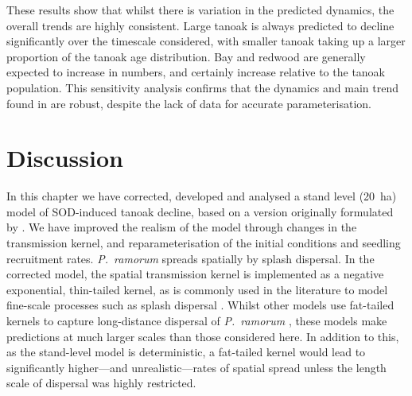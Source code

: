 These results show that whilst there is variation in the predicted dynamics, the overall trends are highly consistent. Large tanoak is always predicted to decline significantly over the timescale considered, with smaller tanoak taking up a larger proportion of the tanoak age distribution. Bay and redwood are generally expected to increase in numbers, and certainly increase relative to the tanoak population. This sensitivity analysis confirms that the dynamics and main trend found in \citet{cobb_ecosystem_2012} are robust, despite the lack of data for accurate parameterisation.

\FloatBarrier

\section{Discussion\label{sec:ch5:discussion}}

In this chapter we have corrected, developed and analysed a stand level (\SI{20}{\hectare}) model of SOD-induced tanoak decline, based on a version originally formulated by \citet{cobb_ecosystem_2012}. We have improved the realism of the model through changes in the transmission kernel, and reparameterisation of the initial conditions and seedling recruitment rates. \emph{P.~ramorum} spreads spatially by splash dispersal. In the corrected model, the spatial transmission kernel is implemented as a negative exponential, thin-tailed kernel, as is commonly used in the literature to model fine-scale processes such as splash dispersal \citep{skelsey_pest_2013}. Whilst other models use fat-tailed kernels to capture long-distance dispersal of \emph{P.~ramorum} \citep[e.g.][]{meentemeyer_epidemiological_2011,harwood_epidemiological_2009}, these models make predictions at much larger scales than those considered here. In addition to this, as the stand-level model is deterministic, a fat-tailed kernel would lead to significantly higher---and unrealistic---rates of spatial spread unless the length scale of dispersal was highly restricted.

